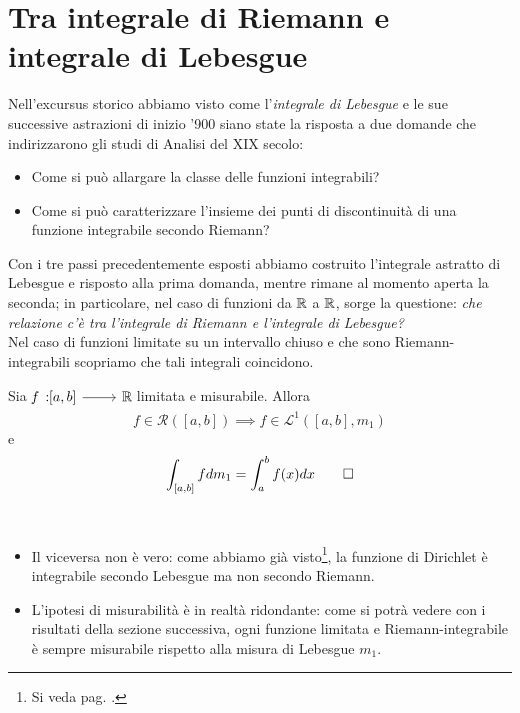 \section{Tra integrale di Riemann e integrale di Lebesgue}
Nell'excursus storico abbiamo visto come l'\textit{integrale di Lebesgue} e le sue successive astrazioni di inizio '900 siano state la risposta a due domande che indirizzarono gli studi di Analisi del XIX secolo:
\begin{itemize}
	\item Come si può allargare la classe delle funzioni integrabili?
	\item Come si può caratterizzare l'insieme dei punti di discontinuità di una funzione integrabile secondo Riemann?
\end{itemize}
Con i tre passi precedentemente esposti abbiamo costruito l'integrale astratto di Lebesgue e risposto alla prima domanda, mentre rimane al momento aperta la seconda; in particolare, nel caso di funzioni da $\mathbb{R}$ a $\mathbb{R}$, sorge la questione: \textit{che relazione c'è tra l'integrale di Riemann e l'integrale di Lebesgue?}\\
Nel caso di funzioni limitate su un intervallo chiuso e che sono Riemann-integrabili scopriamo che tali integrali coincidono.
\begin{theoremaqed}
	Sia $\funz{f}{\left[a,b\right]}{\realset}$ limitata e misurabile. Allora
	\begin{equation}
		f\in\mathcal{R}\left(\left[a,b\right]\right)\implies f\in\mathcal{L}^1\left(\left[a,b\right],m_1\right)
	\end{equation}
e
\begin{equation}
	\int_{\left[a,b\right]}fdm_1=\int_{a}^{b}f(x)dx\qedhere
\end{equation}
\end{theoremaqed}
\begin{observes}~
	\begin{itemize}
		\item Il viceversa non è vero: come abbiamo già visto\footnote{Si veda pag. \pageref{funzionedirichletintegrale}.}, la funzione di Dirichlet è integrabile secondo Lebesgue ma non secondo Riemann.
		\item L'ipotesi di misurabilità è in realtà ridondante: come si potrà vedere con i risultati della sezione successiva, ogni funzione limitata e Riemann-integrabile è sempre misurabile rispetto alla misura di Lebesgue $m_1$.
	\end{itemize}
\end{observes}
